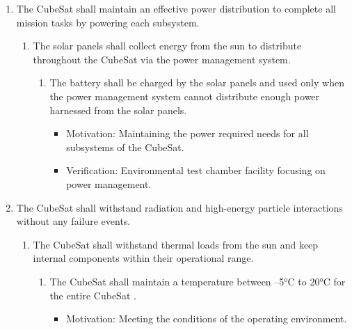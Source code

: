 \begin{enumerate}
\begin{enumerate}
\begin{enumerate}
\begin{itemize}
                \item Motivation: Monitoring location and use as a ping to ensure CubeSat is operational.
                \item Verification: Installation and setup of software decoding package, executing transmit from CubeSat while on the ground, and ensuring the signal is received properly \cite{CSS}. 
            \end{itemize}
        \end{enumerate}
    \end{enumerate} %
    \item The CubeSat shall maintain an effective power distribution to complete all mission tasks by powering each subsystem. 
    \begin{enumerate}
        \item The solar panels shall collect energy from the sun to distribute throughout the CubeSat via the power management system.
        \begin{enumerate}
            \item The battery shall be charged by the solar panels and used only when the power management system cannot distribute enough power harnessed from the solar panels. 
                \begin{itemize}
                    \item Motivation: Maintaining the power required needs for all subsystems of the CubeSat.
                    \item Verification: Environmental test chamber facility focusing on power management.
                \end{itemize}
        \end{enumerate}
    \end{enumerate} %
    \item The CubeSat shall withstand radiation and high-energy particle interactions without any failure events. 
    \begin{enumerate}
        \item The CubeSat shall withstand thermal loads from the sun and keep internal components within their operational range. 
        \begin{enumerate}
            \item The CubeSat shall maintain a temperature between –5°C to 20°C for the entire CubeSat \cite{NICK HELP}.  
                \begin{itemize}
                    \item Motivation: Meeting the conditions of the operating environment.

\end{itemize}
\end{enumerate}
\end{enumerate}
\end{enumerate}

